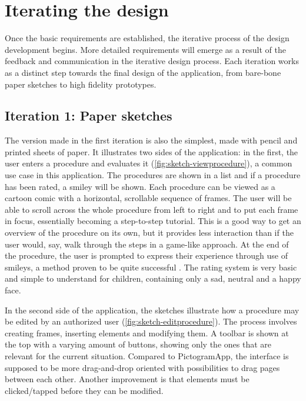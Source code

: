 \chapter{Iterating the design}
\label{ch:iterating}

Once the basic requirements are established, the iterative process of the design development begins. More detailed requirements will emerge as a result of the feedback and communication in the iterative design process. Each iteration works as a distinct step towards the final design of the application, from bare-bone paper sketches to high fidelity prototypes.

\section{Iteration 1: Paper sketches}
\label{sec:iteration1}

The version made in the first iteration is also the simplest, made with pencil and printed sheets of paper. It illustrates two sides of the application: in the first, the user enters a procedure and evaluates it (\autoref{fig:sketch-viewprocedure}), a common use case in this application. The procedures are shown in a list and if a procedure has been rated, a smiley will be shown. Each procedure can be viewed as a cartoon comic with a horizontal, scrollable sequence of frames. The user will be able to scroll across the whole procedure from left to right and to put each frame in focus, essentially becoming a step-to-step tutorial. This is a good way to get an overview of the procedure on its own, but it provides less interaction than if the user would, say, walk through the steps in a game-like approach. At the end of the procedure, the user is prompted to express their experience through use of smileys, a method proven to be quite successful \parencite{stalberg2016}. The rating system is very basic and simple to understand for children, containing only a sad, neutral and a happy face.

In the second side of the application, the sketches illustrate how a procedure may be edited by an authorized user (\autoref{fig:sketch-editprocedure}). The process involves creating frames, inserting elements and modifying them. A toolbar is shown at the top with a varying amount of buttons, showing only the ones that are relevant for the current situation. Compared to PictogramApp, the interface is supposed to be more drag-and-drop oriented with possibilities to drag pages between each other. Another improvement is that elements must be clicked/tapped before they can be modified.

